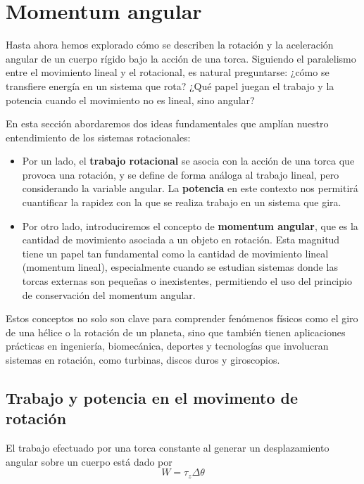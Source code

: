 \setcounter{page}{136}
\setcounter{figure}{0}
\setcounter{chapter}{15}

\chapter{Momentum angular}
\label{cap:cap15}
\vspace{-10ex}

\raggedright

Hasta ahora hemos explorado cómo se describen la rotación y la aceleración angular de un cuerpo rígido bajo la acción de una torca. Siguiendo el paralelismo entre el movimiento lineal y el rotacional, es natural preguntarse: ¿cómo se transfiere energía en un sistema que rota? ¿Qué papel juegan el trabajo y la potencia cuando el movimiento no es lineal, sino angular?

En esta sección abordaremos dos ideas fundamentales que amplían nuestro entendimiento de los sistemas rotacionales:


\begin{itemize}
\item Por un lado, el \textbf{trabajo rotacional} se asocia con la acción de una torca que provoca una rotación, y se define de forma análoga al trabajo lineal, pero considerando la variable angular. La \textbf{potencia} en este contexto nos permitirá cuantificar la rapidez con la que se realiza trabajo en un sistema que gira.


\item Por otro lado, introduciremos el concepto de \textbf{momentum angular}, que es la cantidad de movimiento asociada a un objeto en rotación. Esta magnitud tiene un papel tan fundamental como la cantidad de movimiento lineal (momentum lineal), especialmente cuando se estudian sistemas donde las torcas externas son pequeñas o inexistentes, permitiendo el uso del principio de conservación del momentum angular.
\end{itemize}


Estos conceptos no solo son clave para comprender fenómenos físicos como el giro de una hélice o la rotación de un planeta, sino que también tienen aplicaciones prácticas en ingeniería, biomecánica, deportes y tecnologías que involucran sistemas en rotación, como turbinas, discos duros y giroscopios.
\section{Trabajo y potencia en el movimento de rotaci\'on}
El trabajo efectuado por una torca constante al generar un desplazamiento angular sobre un cuerpo est\'a dado por
\begin{equation}
    W=\tau_z \Delta \theta
\end{equation}

